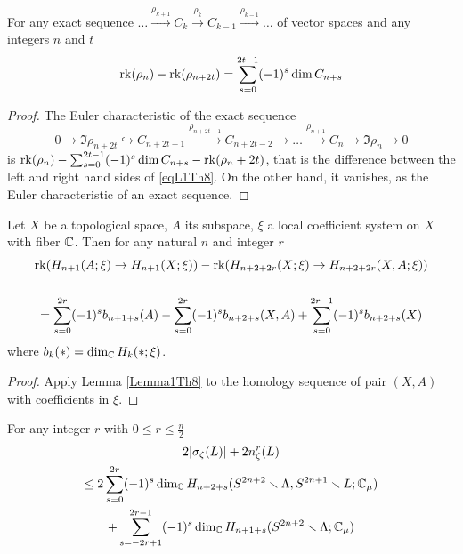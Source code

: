 \documentclass{article}
\numberwithin{equation}{section}
\begin{document}
\begin{lem}\label{Lemma1Th8}
For any exact sequence $\dots\overset{\rho_{k+1}}\to C_k\overset{\rho_k}\to
 C_{k-1}\overset{\rho_{k-1}}\to\dots$ of vector spaces
and any integers $n$ and $t$ 
\begin{equation}\label{eqL1Th8} \operatorname{rk}(\rho_{n})-\operatorname{rk}(\rho_{n+2t})
=\sum_{s=0}^{2t-1}(-1)^s\dim C_{n+s}
\end{equation}
\end{lem}

\begin{proof}The Euler characteristic of the exact sequence
$$
0\to\Im\rho_{n+2t}\hookrightarrow C_{n+2t-1}\overset{\rho_{n+2t-1}}\to
C_{n+2t-2}\to\dots\overset{\rho_{n+1}}\to C_{n}\to\Im\rho_{n}\to0
$$ 
is 
$
\operatorname{rk}(\rho_{n})-\sum_{s=0}^{2t-1}(-1)^s\dim C_{n+s}-\operatorname{rk}(\rho_n+2t)$,
that is the difference between the left and right hand sides of
\eqref{eqL1Th8}.
On the other hand, it vanishes, as the Euler characteristic of an exact
sequence. 
\end{proof}

\begin{lem}\label{Lemma2Th8}
Let $X$ be a topological space, $A$ its subspace, $\xi$ a local coefficient
system on $X$ with fiber $\mathbb C$. Then for any natural $n$ and integer 
$r$
\begin{multline}
\operatorname{rk}(H_{n+1}(A;\xi)\to H_{n+1}(X;\xi))-
 \operatorname{rk}(H_{n+2+2r}(X;\xi)\to H_{n+2+2r}(X,A;\xi))\\
\\=
\sum_{s=0}^{2r}(-1)^sb_{n+1+s}(A)
-\sum_{s=0}^{2r}(-1)^sb_{n+2+s}(X,A)
+\sum_{s=0}^{2r-1}(-1)^sb_{n+2+s}(X)
\end{multline} 
where $b_k(*)=\dim_\mathbb C H_k(*;\xi)$.
\end{lem}

\begin{proof}
Apply Lemma \ref{Lemma1Th8} to the homology sequence of pair $(X,A)$ with
coefficients in $\xi$.
\end{proof}

\begin{lem}\label{Lemma2Th}
For any integer $r$ with $0\le r\le\frac{n}2$\\   
\begin{multline}\label{IneQSlice}
2|\sigma_\zeta(L)|+2n^r_\zeta(L)\\
\le 2\sum_{s=0}^{2r}(-1)^s\dim_\mathbb C
H_{n+2+s}(S^{2n+2}\smallsetminus\Lambda,S^{2n+1}\smallsetminus L;\mathbb C_\mu)\\
+\sum_{s=-2r+1}^{2r-1}(-1)^s\dim_\mathbb C H_{n+1+s}(S^{2n+2}\smallsetminus\Lambda;\mathbb C_\mu)
\end{multline}
\end{lem}
\end{document}
